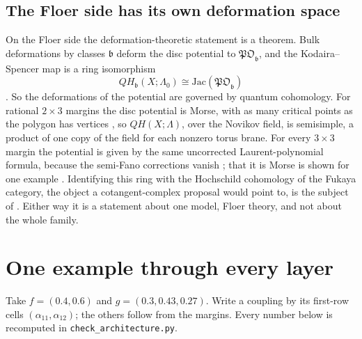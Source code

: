 \documentclass[11pt]{article}
\theoremstyle{definition}
\theoremstyle{remark}
\begin{document}
\subsection{The Floer side has its own deformation space}

On the Floer side the deformation-theoretic statement is a theorem. Bulk deformations by classes $\mathfrak b$ deform the disc potential to
$\mathfrak{PO}_{\mathfrak b}$, and the Kodaira--Spencer map is a ring isomorphism
\[
QH_{\mathfrak b}(X;\Lambda_0)\cong\mathrm{Jac}(\mathfrak{PO}_{\mathfrak b})
\]
\cite[Thm.~1.1.1]{FOOO2016}. So the deformations of the potential are governed by quantum cohomology. For rational $2\times3$ margins the disc
potential is Morse, with as many critical points as the polygon has vertices \cite[Thm.~8.2]{Bridges}, so $QH(X;\Lambda)$, over the Novikov
field, is semisimple, a product of one copy of the field for each nonzero torus brane. For every $3\times3$ margin the potential is given by the
same uncorrected Laurent-polynomial formula, because the semi-Fano corrections vanish \cite[Thm.~8.4]{Bridges}; that it is Morse is shown for
one example \cite[Ex.~8.5]{Bridges}. Identifying this ring with the Hochschild cohomology of the Fukaya category, the object a cotangent-complex
proposal would point to, is the subject of \cite{AFOOO2026}. Either way it is a statement about one model, Floer theory, and not about the
whole family.

\section{One example through every layer}\label{sec:example}

Take $f=(0.4,0.6)$ and $g=(0.3,0.43,0.27)$. Write a coupling by its first-row cells $(\alpha_{11},\alpha_{12})$; the others follow from the
margins. Every number below is recomputed in \texttt{check\_architecture.py}.
\end{document}
